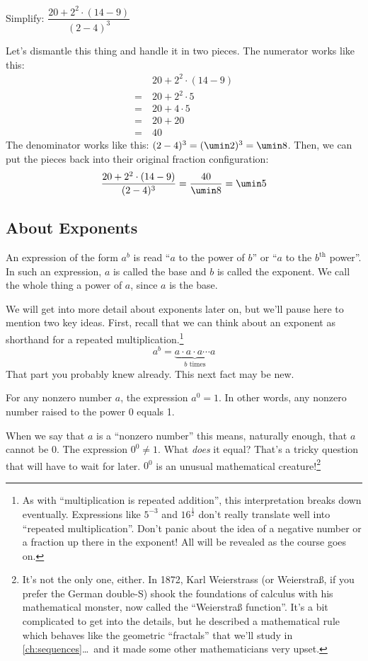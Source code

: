 \begin{boxedex}
Simplify: $\dfrac{20+2^2\cdot(14-9)}{(2-4)^3}$

\exsoln{} Let's dismantle this thing and handle it in two pieces. The numerator works like this:
\[\begin{aligned}
	&~ 20 + 2^2 \cdot (14-9)\\
=	&~ 20 + 2^2 \cdot 5\\
=	&~ 20 + 4 \cdot 5\\
=	&~ 20 + 20\\
=	&~ 40
\end{aligned}\]
The denominator works like this: $(2-4)^3 = (\umin2)^3 = \umin8$. Then, we can put the pieces back into their original fraction configuration:\[\dfrac{20+2^2\cdot(14-9)}{(2-4)^3} = \dfrac{40}{\umin8} = \umin5\]
\end{boxedex}

\subsection{About Exponents}

An expression of the form $a^b$ is read ``$a$ to the power of $b$'' or ``$a$ to the $b^{\text{th}}$ power''. In such an expression, $a$ is called the \gls{base} and $b$ is called the \gls{exponent}. We call the whole thing a \gls{power} of $a$, since $a$ is the base.

We will get into more detail about exponents later on, but we'll pause here to mention two key ideas. First, recall that we can think about an exponent as shorthand for a repeated multiplication.\footnote{As with ``multiplication is repeated addition'', this interpretation breaks down eventually. Expressions like $5^{-3}$ and $16^{\frac{1}{2}}$ don't really translate well into ``repeated multiplication''. Don't panic about the idea of a negative number or a fraction up there in the exponent! All will be revealed as the course goes on.}
\[a^b = \underbrace{a \cdot a \cdot a \dotsb a}_{\text{$b$ times}}\]
That part you probably knew already. This next fact may be new.

\begin{boxeddef}
For any nonzero number $a$, the expression $a^0 = 1$. In other words, any nonzero number raised to the power 0 equals 1.

When we say that $a$ is a ``nonzero number'' this means, naturally enough, that $a$ cannot be 0. The expression $0^0 \neq 1$. What \textit{does} it equal? That's a tricky question that will have to wait for later. $0^0 $ is an unusual mathematical creature!\footnote{It's not the only one, either. In 1872, Karl Weierstrass (or Weierstra\ss, if you prefer the German double-S) shook the foundations of calculus with his mathematical monster, now called the ``Weierstra\ss{} function''. It's a bit complicated to get into the details, but he described a mathematical rule which behaves like the geometric ``fractals'' that we'll study in \cref{ch:sequences}\ldots\ and it made some other mathematicians very upset.}
\end{boxeddef}


